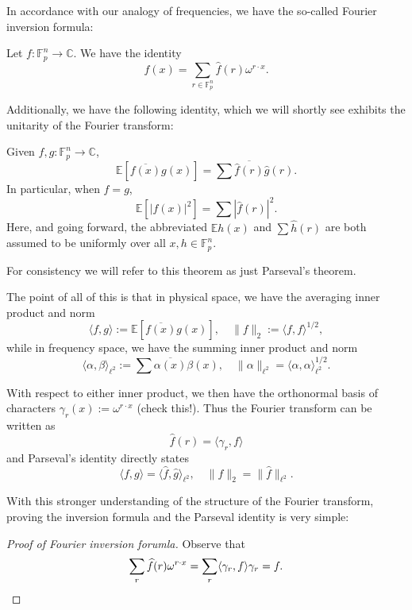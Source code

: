 \documentclass[10pt]{scrartcl}
\providecommand{\ol}{\overline}
\providecommand{\CC}{\mathbb C}
\providecommand{\EE}{\mathbb E}
\providecommand{\FF}{\mathbb F}
\providecommand{\RR}{\mathbb R}
\providecommand{\ZZ}{\mathbb Z}
\renewcommand{\hat}{\widehat}
\providecommand{\norm}[1]{\| #1 \|}
\providecommand{\vocab}[1]{{\textbf{\textcolor{ForestGreen}{#1}}}}
\begin{document}
In accordance with our analogy of frequencies, we have the so-called
Fourier inversion formula:
\begin{theorem}
	Let $f\colon\FF_p^n\to\CC$. We have the identity
	\[f(x) = \sum_{r\in\FF_p^n} \hat f(r)\omega^{r\cdot x}.\]
\end{theorem}


Additionally, we have the following identity,
which we will shortly see exhibits the unitarity of the Fourier transform:
\begin{theorem}
	Given $f,g\colon\FF_p^n\to\CC$,
	\[\EE[\ol{ f(x)}g(x)] = \sum \ol{\hat f(r)} \hat g(r).\]
	In particular, when $f=g$,
	\[\EE[|f(x)|^2] = \sum|\hat f(r)|^2.\]
	Here, and going forward, the abbreviated $\EE h(x)$ and $\sum \hat h(r)$
	are both assumed to be uniformly over all $x,h\in\FF_p^n$.
\end{theorem}
For consistency we will refer to this theorem as just Parseval's theorem.

The point of all of this is that in physical space,
we have the averaging inner product and norm
\[\langle f,g\rangle := \EE[\ol{f(x)}g(x)],\quad
\norm{f}_2 := \langle f,f\rangle^{1/2},\]
while in frequency space, we have the summing inner product and norm
\[\langle \alpha,\beta\rangle_{\ell^2} := \sum\ol{\alpha(x)}\beta(x),\quad
\norm{\alpha}_{\ell^2} = \langle\alpha,\alpha\rangle_{\ell^2}^{1/2}.\]

With respect to either inner product, we then have the orthonormal basis
of characters $\gamma_r(x) := \omega^{r\cdot x}$ (check this!).
Thus the Fourier transform can be written as
\[\hat f(r) = \langle \gamma_r, f\rangle\]
and Parseval's identity directly states
\[\langle f,g\rangle = \langle \hat f,\hat g\rangle_{\ell^2},\quad
\norm f_2 = \norm{\hat f}_{\ell^2}.\]

With this stronger understanding of the structure of the Fourier transform,
proving the inversion formula and the Parseval identity is very simple:
\begin{proof}[Proof of Fourier inversion forumla]
	Observe that
	\[\sum_r \hat f(r)\omega^{r\cdot x} =
	\sum_r \langle \gamma_r,f\rangle\gamma_r = f.\qedhere\]
\end{proof}
\end{document}
